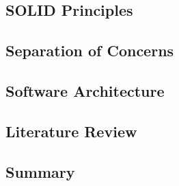 \subsection{SOLID Principles}


\subsection{Separation of Concerns}


\subsection{Software Architecture}


\subsection{Literature Review}
\label{section:2.7}


\subsection{Summary}









